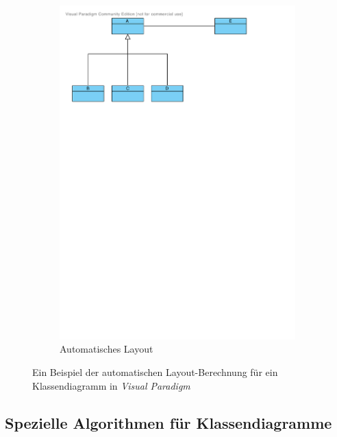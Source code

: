 \begin{figure}[hbt]
\begin{subfigure}{\rightsubfigurewidth}
        \includegraphics[scale=\graphicsscale]{resources/visual-paradigm-auto-layout-b}
        \caption{Automatisches Layout}
        \label{fig:visual-paradigm-auto-layout-b}
    \end{subfigure}
    \caption{Ein Beispiel der automatischen Layout-Berechnung für ein Klassendiagramm in \textit{Visual Paradigm}}
    \label{fig:visual-paradigm-auto-layout}
\end{figure}

\subsection{Spezielle Algorithmen für Klassendiagramme}


